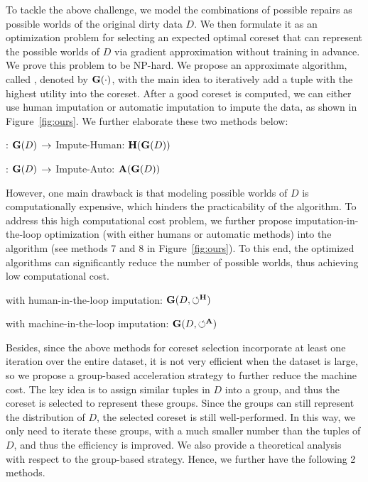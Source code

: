 To tackle the above challenge, we model the combinations of possible repairs as possible worlds of the original dirty data $D$. 
We then formulate it as an optimization problem for selecting an expected optimal coreset that can represent the  possible worlds of $D$ via gradient approximation without training in advance. We prove this problem to be NP-hard. We propose an approximate algorithm, called \ours, denoted by $\mathbf{G}(\cdot)$, with the main idea to iteratively add a tuple with the highest utility  into the coreset. 
After a good coreset is computed, we can either use human imputation or automatic imputation to impute the data, as shown in Figure~\ref{fig:ours}.
We further elaborate these two methods below:

\bi
	\item[(5)] \ours: $\mathbf{G}(D)$ $\rightarrow$ Impute-Human: $\mathbf{H}(\mathbf{G}(D))$
	\item[(6)] \ours: $\mathbf{G}(D)$ $\rightarrow$ Impute-Auto: $\mathbf{A}(\mathbf{G}(D))$
\ei

However, one main drawback is that modeling possible worlds of $D$ is computationally expensive, which hinders the practicability of the \ours algorithm.  To address this high computational cost problem, we further propose  imputation-in-the-loop optimization (with either humans or automatic methods) into the \ours algorithm (see methods 7 and 8 in Figure~\ref{fig:ours}). To this end, the optimized algorithms can significantly reduce the number of possible worlds, thus achieving low computational cost. 

\bi
	\item[(7)] \ours with human-in-the-loop imputation: $\mathbf{G}(D, \circlearrowleft^\mathbf{H})$ 
	\item[(8)] \ours with machine-in-the-loop imputation: $\mathbf{G}(D, \circlearrowleft^\mathbf{A})$
\ei






Besides, since the above methods for coreset selection incorporate at least one iteration over the entire dataset, it is not very efficient when the dataset is large, so we propose a group-based acceleration strategy to further reduce the machine cost. The key idea is to assign similar tuples in $D$ into a group, and thus the coreset is selected to represent these groups. Since the groups can still represent the distribution of $D$, the selected coreset is still well-performed. In this way, we only need to iterate these groups, with a much smaller number than the tuples of $D$, and thus the efficiency is improved. We also provide a theoretical analysis with respect to the group-based strategy. Hence, we further have the following 2 methods.

